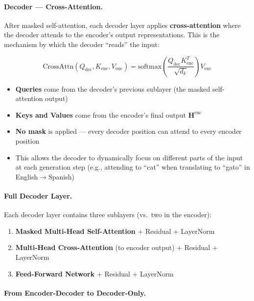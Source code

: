 \paragraph{Decoder --- Cross-Attention.}
\label{decoder-cross-attention.}

After masked self-attention, each decoder layer applies \textbf{cross-attention} where the decoder attends to the encoder’s output representations. This is the mechanism by which the decoder ``reads'' the input:

\begin{equation}
  \text{CrossAttn}(Q_{\text{dec}}, K_{\text{enc}}, V_{\text{enc}}) = \text{softmax}\!\left(\frac{Q_{\text{dec}} K_{\text{enc}}^T}{\sqrt{d_k}}\right) V_{\text{enc}}
\end{equation}

\begin{itemize}
  \item \textbf{Queries} come from the decoder’s previous sublayer (the masked self-attention output)
  \item \textbf{Keys and Values} come from the encoder’s final output $\mathbf{H}^{\text{enc}}$
  \item \textbf{No mask} is applied --- every decoder position can attend to every encoder position
  \item This allows the decoder to dynamically focus on different parts of the input at each generation step (e.g., attending to ``cat'' when translating to ``gato'' in English$\to$Spanish)
\end{itemize}

\paragraph{Full Decoder Layer.}
\label{full-decoder-layer.}

Each decoder layer contains three sublayers (vs.~two in the encoder):

\begin{enumerate}
  \item \textbf{Masked Multi-Head Self-Attention} + Residual + LayerNorm
  \item \textbf{Multi-Head Cross-Attention} (to encoder output) + Residual + LayerNorm
  \item \textbf{Feed-Forward Network} + Residual + LayerNorm
\end{enumerate}

\paragraph{From Encoder-Decoder to Decoder-Only.}
\label{from-encoder-decoder-to-decoder-only.}

